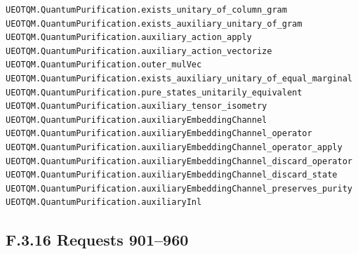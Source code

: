 \documentclass[
  11pt,
  oneside]{book}
\begin{document}
\begin{Verbatim}[breaklines,breakanywhere,fontsize=\scriptsize]
UEOTQM.QuantumPurification.exists_unitary_of_column_gram
UEOTQM.QuantumPurification.exists_auxiliary_unitary_of_gram
UEOTQM.QuantumPurification.auxiliary_action_apply
UEOTQM.QuantumPurification.auxiliary_action_vectorize
UEOTQM.QuantumPurification.outer_mulVec
UEOTQM.QuantumPurification.exists_auxiliary_unitary_of_equal_marginal
UEOTQM.QuantumPurification.pure_states_unitarily_equivalent
UEOTQM.QuantumPurification.auxiliary_tensor_isometry
UEOTQM.QuantumPurification.auxiliaryEmbeddingChannel
UEOTQM.QuantumPurification.auxiliaryEmbeddingChannel_operator
UEOTQM.QuantumPurification.auxiliaryEmbeddingChannel_operator_apply
UEOTQM.QuantumPurification.auxiliaryEmbeddingChannel_discard_operator
UEOTQM.QuantumPurification.auxiliaryEmbeddingChannel_discard_state
UEOTQM.QuantumPurification.auxiliaryEmbeddingChannel_preserves_purity
UEOTQM.QuantumPurification.auxiliaryInl
\end{Verbatim}

\subsection{F.3.16 Requests 901--960}
\end{document}
